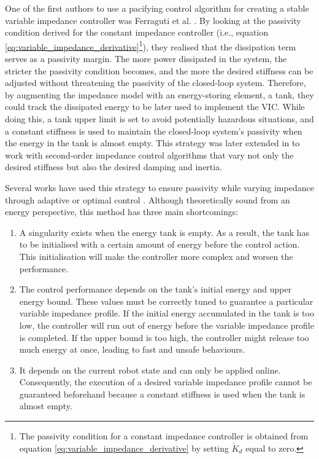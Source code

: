 One of the first authors to use a pacifying control algorithm for creating a stable variable impedance controller was Ferraguti et al. \cite{ferragutiTankbasedApproachImpedance2013}. By looking at the passivity condition derived for the constant impedance controller (i.e., equation \eqref{eq:variable_impedance_derivative}\footnote{The passivity condition for a constant impedance controller is obtained from equation \eqref{eq:variable_impedance_derivative} by setting $\dot{K}_d$ equal to zero.}), they realised that the dissipation term serves as a passivity margin. The more power dissipated in the system, the stricter the passivity condition becomes, and the more the desired stiffness can be adjusted without threatening the passivity of the closed-loop system. Therefore, by augmenting the impedance model with an energy-storing element, a tank, they could track the dissipated energy to be later used to implement the VIC. While doing this, a tank upper limit is set to avoid potentially hazardous situations, and a constant stiffness is used to maintain the closed-loop system's passivity when the energy in the tank is almost empty. This strategy was later extended in \cite{ferragutiEnergyTankBasedInteractive2015} to work with second-order impedance control algorithms that vary not only the desired stiffness but also the desired damping and inertia.

Several works have used this strategy to ensure passivity while varying impedance through adaptive or optimal control \cite{cordoniVariableStochasticAdmittance2020,dietrichPassivationProjectionBasedNull2016,dietrichPassiveHierarchicalImpedance2017,michelPassivitybasedVariableImpedance2020,chenDrawingElonMusk2021,balattiMethodAutonomousRobotic2020,scibiliaSelfAdaptiveRobotControl2018,selvaggioPassiveVirtualFixtures2018,tadeleCombiningEnergyPower2014,karacanPassivityBasedSkillMotion2022,jinModelPredictiveVariable2023}. Although theoretically sound from an energy perspective, this method has three main shortcomings:
\begin{enumerate}
    \item A singularity exists when the energy tank is empty. As a result, the tank has to be initialised with a certain amount of energy before the control action. This initialisation will make the controller more complex and worsen the performance.
    \item The control performance depends on the tank's initial energy and upper energy bound. These values must be correctly tuned to guarantee a particular variable impedance profile. If the initial energy accumulated in the tank is too low, the controller will run out of energy before the variable impedance profile is completed. If the upper bound is too high, the controller might release too much energy at once, leading to fast and unsafe behaviours.
    \item It depends on the current robot state and can only be applied online. Consequently, the execution of a desired variable impedance profile cannot be guaranteed beforehand because a constant stiffness is used when the tank is almost empty.
\end{enumerate}

